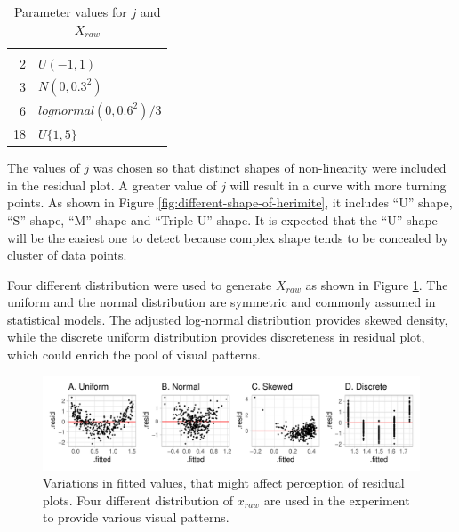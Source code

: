 \documentclass[]{interact}
\theoremstyle{plain}%
\theoremstyle{definition}
\theoremstyle{remark}
\begin{document}
\begin{table}

\caption{\label{tab:model-parameter-table}Parameter values for $j$ and $X_{raw}$}
\centering
\begin{tabular}[t]{rl}
\toprule
{} &  \\
\cmidrule(l{3pt}r{3pt}){1-1} \cmidrule(l{3pt}r{3pt}){2-2}
2 & $U(-1, 1)$\\
3 & $N(0, 0.3^2)$\\
6 & $lognormal(0, 0.6^2)/3$\\
18 & $U\{1, 5\}$\\
\bottomrule
\end{tabular}
\end{table}

The values of \(j\) was chosen so that distinct shapes of non-linearity
were included in the residual plot. A greater value of \(j\) will result
in a curve with more turning points. As shown in Figure
\ref{fig:different-shape-of-herimite}, it includes ``U'' shape, ``S''
shape, ``M'' shape and ``Triple-U'' shape. It is expected that the ``U''
shape will be the easiest one to detect because complex shape tends to
be concealed by cluster of data points.

Four different distribution were used to generate \(X_{raw}\) as shown
in Figure \ref{fig:different-dist}. The uniform and the normal
distribution are symmetric and commonly assumed in statistical models.
The adjusted log-normal distribution provides skewed density, while the
discrete uniform distribution provides discreteness in residual plot,
which could enrich the pool of visual patterns.

\begin{figure}

{\centering \includegraphics[width=1\linewidth]{paper_comparison_files/figure-latex/different-dist-1} 

}

\caption{Variations in fitted values, that might affect perception of residual plots. Four different distribution of $x_{raw}$ are used in the experiment to provide various visual patterns.}\label{fig:different-dist}
\end{figure}
\end{document}
